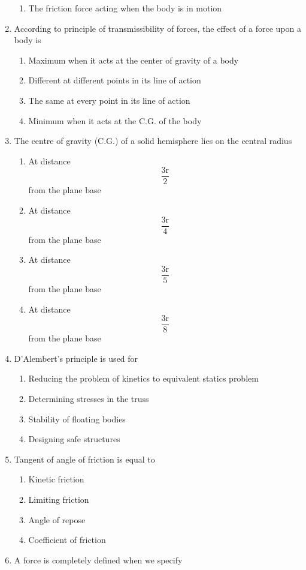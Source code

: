 \documentclass[11pt,a4paper]{article}
\begin{document}
\begin{enumerate}
\begin{enumerate}[label=\Alph*.]
\item{The friction force acting when the body is in motion}
\end{enumerate}
\item{According to principle of transmissibility of forces, the effect of a force upon a body is}
\begin{enumerate}[label=\Alph*.]
\item{Maximum when it acts at the center of gravity of a body}
\item{Different at different points in its line of action}
\item{The same at every point in its line of action}
\item{Minimum when it acts at the C.G. of the body}
\end{enumerate}
\item{The centre of gravity (C.G.) of a solid hemisphere lies on the central radius}
\begin{enumerate}[label=\Alph*.]
\item{At distance $$\frac{{3{\text{r}}}}{2}$$ from the plane base}
\item{At distance $$\frac{{3{\text{r}}}}{4}$$ from the plane base}
\item{At distance $$\frac{{3{\text{r}}}}{5}$$ from the plane base}
\item{At distance $$\frac{{3{\text{r}}}}{8}$$ from the plane base}
\end{enumerate}
\item{D'Alembert's principle is used for
}
\begin{enumerate}[label=\Alph*.]
\item{Reducing the problem of kinetics to equivalent statics problem}
\item{Determining stresses in the truss}
\item{Stability of floating bodies}
\item{Designing safe structures}
\end{enumerate}
\item{Tangent of angle of friction is equal to}
\begin{enumerate}[label=\Alph*.]
\item{Kinetic friction}
\item{Limiting friction}
\item{Angle of repose}
\item{Coefficient of friction}
\end{enumerate}
\item{A force is completely defined when we specify}

\end{enumerate}
\end{document}
